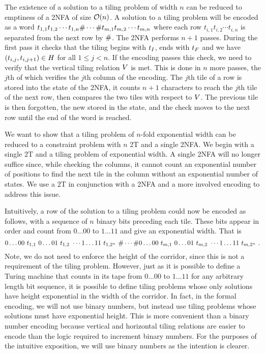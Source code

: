 The existence of a solution to a tiling problem of width $n$ can be reduced to emptiness of a 2NFA of size 
${\mathcal{O}}\mathord{\left( n \right)}$.
A solution to a tiling problem will be encoded as a word 
$t_{1,1} t_{1,2} \cdots t_{1,n} \# \cdots \# t_{m,1} t_{m,2} \cdots t_{m,n}$
where each row
$t_{i,1} t_{i,2} \cdots t_{i,n}$
is separated from the next row by $\#$.
The 2NFA performs $n+1$ passes.
During the first pass it checks that the tiling begins with $t_I$, ends with $t_F$ and we have 
$\left( t_{i,j}, t_{i,j+1} \right) \in H$
for all
$1 \leq j < n$.
If the encoding passes this check, we need to verify that the vertical tiling relation $V$ is met.
This is done in $n$ more passes, the $j$th of which verifies the $j$th column of the encoding.
The $j$th tile of a row is stored into the state of the 2NFA, it counts $n+1$ characters to reach the $j$th tile of the next row, then compares the two tiles with respect to $V$.
The previous tile is then forgotten, the new stored in the state, and the check moves to the next row until the end of the word is reached.

We want to show that a tiling problem of $n$-fold exponential width can be reduced to a constraint problem with $n$ 2T and a single 2NFA.
We begin with a single 2T and a tiling problem of exponential width.
A single 2NFA will no longer suffice since, while checking the columns, it cannot count an exponential number of positions to find the next tile in the column without an exponential number of states.
We use a 2T in conjunction with a 2NFA and a more involved encoding to address this issue.

Intuitively, a row of the solution to a tiling problem could now be encoded as follows, with a sequence of $n$ binary bits preceding each tile.
These bits appear in order and count from $0\ldots00$ to $1\ldots11$ and give an exponential width.
That is
\[
    0\ldots00\ \tile_{1,1}\ %
    0\ldots01\ \tile_{1,2}\ %
    \cdots
    1\ldots11\ \tile_{1,2^n}\ %
    \numsep
    \cdots
    \numsep
    0\ldots00\ \tile_{m,1}\ %
    0\ldots01\ \tile_{m,2}\ %
    \cdots
    1\ldots11\ \tile_{m,2^n} \ .
\]
Note, we do not need to enforce the height of the corridor, since this is not a requirement of the tiling problem.
However, just as it is possible to define a Turing machine that counts in its tape from $0\ldots00$ to $1\ldots11$ for any arbitrary length bit sequence, it is possible to define tiling problems whose only solutions have height exponential in the width of the corridor.
In fact, in the formal encoding, we will not use binary numbers, but instead use tiling problems whose solutions must have exponential height.
This is more convenient than a binary number encoding because vertical and horizontal tiling relations are easier to encode than the logic required to increment binary numbers.
For the purposes of the intuitive exposition, we will use binary numbers as the intention is clearer.


